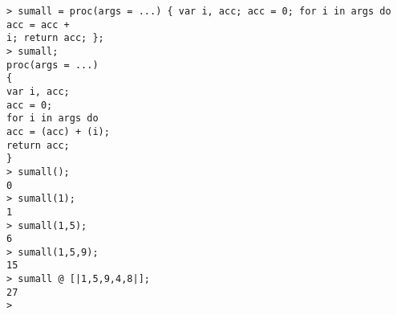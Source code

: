 \begin{center}\begin{minipage}{15cm}\begin{Verbatim}[frame=single]
> sumall = proc(args = ...) { var i, acc; acc = 0; for i in args do acc = acc + 
i; return acc; };
> sumall;
proc(args = ...)
{
var i, acc;
acc = 0;
for i in args do
acc = (acc) + (i);
return acc;
}
> sumall();
0
> sumall(1);
1
> sumall(1,5);
6
> sumall(1,5,9);
15
> sumall @ [|1,5,9,4,8|];
27
> 
\end{Verbatim}
\end{minipage}\end{center}
